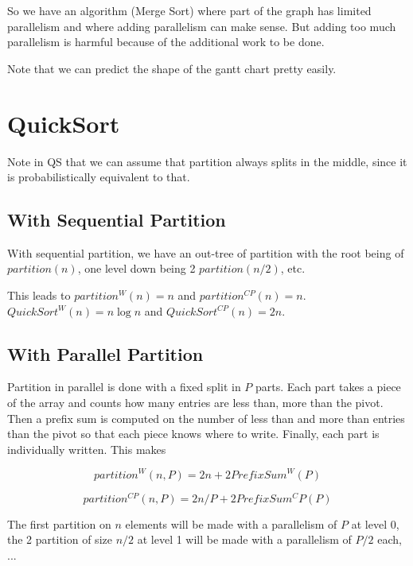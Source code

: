 \documentclass{article}
\begin{document}
So we have an algorithm (Merge Sort) where part of the graph has
limited parallelism and where adding parallelism can make sense. But
adding too much parallelism is harmful because of the additional work
to be done.

Note that we can predict the shape of the gantt chart pretty easily.

\section{QuickSort}

Note in QS that we can assume that partition always splits in the
middle, since it is probabilistically equivalent to that.

\subsection{With Sequential Partition}

With sequential partition, we have an out-tree of partition with the
root being of $partition(n)$, one level down being 2 $partition(n/2)$,
etc.

This leads to $partition^W(n) = n$ and
$partition^{CP}(n)=n$. $QuickSort^W(n) = n \log n$ and
$QuickSort^{CP}(n) = 2n$.

\subsection{With Parallel Partition}

Partition in parallel is done with a fixed split in $P$ parts. Each
part takes a piece of the array and counts how many entries are less
than, more than the pivot. Then a prefix sum is computed on the number
of less than and more than entries than the pivot so that each piece
knows where to write. Finally, each part is individually written. This
makes

$$partition^W(n, P) = 2 n + 2 PrefixSum^W(P)$$

$$partition^{CP}(n, P) = 2 n/P + 2 PrefixSum^CP(P)$$

The first partition on $n$ elements will be made with a parallelism of
$P$ at level 0, the 2 partition of size $n/2$ at level 1 will be made with a parallelism of $P/2$ each, ...
\end{document}
